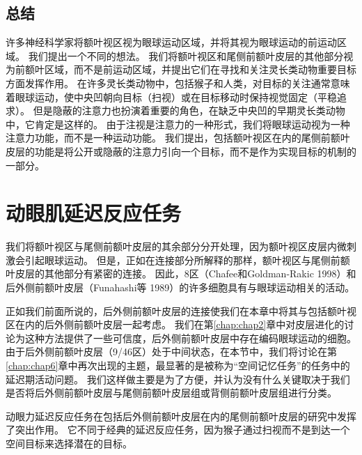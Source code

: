 \subsection{总结}

许多神经科学家将额叶视区视为眼球运动区域，并将其视为眼球运动的前运动区域。
我们提出一个不同的想法。
我们将额叶视区和尾侧前额叶皮层的其他部分视为前额叶区域，而不是前运动区域，并提出它们在寻找和关注灵长类动物重要目标方面发挥作用。
在许多灵长类动物中，包括猴子和人类，对目标的关注通常意味着眼球运动，使中央凹朝向目标（扫视）或在目标移动时保持视觉固定（平稳追求）。
但是隐蔽的注意力也扮演着重要的角色，在缺乏中央凹的早期灵长类动物中，它肯定是这样的。
由于注视是注意力的一种形式，我们将眼球运动视为一种注意力功能，而不是一种运动功能。
我们提出，包括额叶视区在内的尾侧前额叶皮层的功能是将公开或隐蔽的注意力引向一个目标，而不是作为实现目标的机制的一部分。



\section{动眼肌延迟反应任务}

我们将额叶视区与尾侧前额叶皮层的其余部分分开处理，因为额叶视区皮层内微刺激会引起眼球运动。
但是，正如在连接部分所解释的那样，额叶视区与尾侧前额叶皮层的其他部分有紧密的连接。
因此，8区（Chafee和Goldman-Rakic 1998）和后外侧前额叶皮层（Funahashi等 1989）的许多细胞具有与眼球运动相关的活动。


正如我们前面所说的，后外侧前额叶皮层的连接使我们在本章中将其与包括额叶视区在内的后外侧前额叶皮层一起考虑。
我们在第\ref{chap:chap2}章中对皮层进化的讨论为这种方法提供了一些可信度，后外侧前额叶皮层中存在编码眼球运动的细胞。
由于后外侧前额叶皮层（9/46区）处于中间状态，在本节中，我们将讨论在第\ref{chap:chap6}章中再次出现的主题，最显著的是被称为“空间记忆任务”的任务中的延迟期活动问题。
我们这样做主要是为了方便，并认为没有什么关键取决于我们是否将后外侧前额叶皮层与尾侧前额叶皮层组或背侧前额叶皮层组进行分类。


动眼力延迟反应任务在包括后外侧前额叶皮层在内的尾侧前额叶皮层的研究中发挥了突出作用。
它不同于经典的延迟反应任务，因为猴子通过扫视而不是到达一个空间目标来选择潜在的目标。


